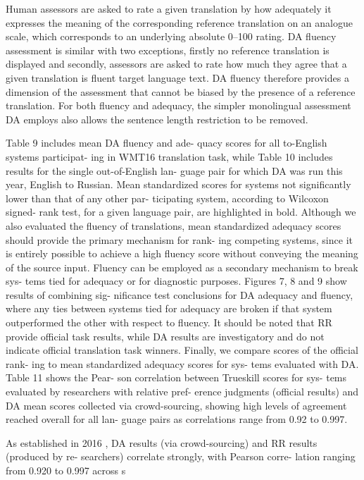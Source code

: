 Human assessors are asked to rate a given translation by how adequately it expresses the meaning of the corresponding reference translation on an analogue scale, which corresponds to an underlying absolute 0–100 rating. DA fluency assessment is similar with two exceptions, firstly no reference translation is displayed and secondly, assessors are asked to rate how much they agree that a given translation is fluent target language text. DA fluency therefore provides a dimension of the assessment that cannot be biased by the presence of a reference translation. For both fluency and adequacy, the simpler monolingual assessment DA employs also allows the sentence length restriction to be removed.

Table 9 includes mean DA fluency and ade- quacy scores for all to-English systems participat- ing in WMT16 translation task, while Table 10 includes results for the single out-of-English lan- guage pair for which DA was run this year, English to Russian. Mean standardized scores for systems not significantly lower than that of any other par- ticipating system, according to Wilcoxon signed- rank test, for a given language pair, are highlighted in bold. Although we also evaluated the fluency of
translations, mean standardized adequacy scores should provide the primary mechanism for rank- ing competing systems, since it is entirely possible to achieve a high fluency score without conveying the meaning of the source input. Fluency can be employed as a secondary mechanism to break sys- tems tied for adequacy or for diagnostic purposes. Figures 7, 8 and 9 show results of combining sig- nificance test conclusions for DA adequacy and fluency, where any ties between systems tied for adequacy are broken if that system outperformed the other with respect to fluency. It should be noted that RR provide official task results, while DA results are investigatory and do not indicate official translation task winners.
Finally, we compare scores of the official rank- ing to mean standardized adequacy scores for sys- tems evaluated with DA. Table 11 shows the Pear- son correlation between Trueskill scores for sys- tems evaluated by researchers with relative pref- erence judgments (official results) and DA mean scores collected via crowd-sourcing, showing high levels of agreement reached overall for all lan- guage pairs as correlations range from 0.92 to 0.997.


 As established in 2016 \cite{wmt16}, DA results (via crowd-sourcing) and RR results (produced by re- searchers) correlate strongly, with Pearson corre- lation ranging from 0.920 to 0.997 across s

